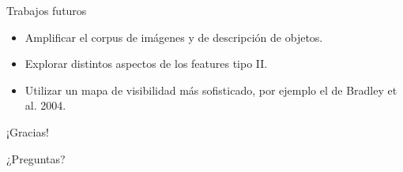 \documentclass[compress]{beamer}
\begin{document}
\begin{frame}{Trabajos futuros}
\begin{itemize}
\item Amplificar el corpus de imágenes y de descripción de objetos.
\item Explorar distintos aspectos de los features tipo II.
\item Utilizar un mapa de visibilidad más sofisticado, por ejemplo el de Bradley et al. 2004.
\end{itemize}
\end{frame}

\begin{frame}
\begin{center}
\Huge ¡Gracias!

\bigskip

\huge ¿Preguntas?
\end{center}
\end{frame}
\end{document}
